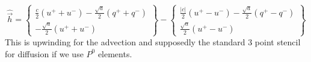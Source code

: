 \documentclass[10pt,dvips,twoside,reqno]{amsart}
\begin{document}
\begin{equation}
\hat{\vec h} = 
\left\{
\begin{array}{c}
\frac{c}{2} (u^+ + u^-)  - \frac{\sqrt{a}}{2} (q^+ + q^-)\\
- \frac{\sqrt{a}}{2}(u^+ + u^-) 
\end{array}
\right\}
-  \left\{
\begin{array}{c}
\frac{|c|}{2}(u^+ - u^-) - \frac{\sqrt{a}}{2}(q^+ - q^-) \\
\frac{\sqrt{a}}{2}(u^+ - u^-)
\end{array}
\right\}
\end{equation}
This is upwinding for the advection and supposedly the standard 3
point stencil for diffusion if we use $P^0$ elements.

 
\end{document}

